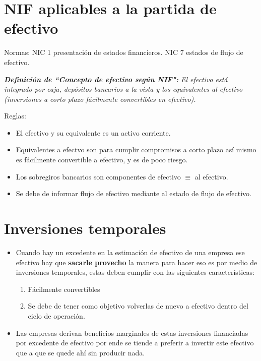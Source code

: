 \documentclass{article}
\begin{document}
\section{NIF aplicables a la partida de efectivo}
Normas: NIC 1  presentación de estados financieros.
NIC 7 estados de flujo de efectivo.


\emph{\textbf{Definición de ``Concepto de efectivo según NIF":} El efectivo está integrado por caja, depósitos bancarios a la vista y los equivalentes al efectivo (inversiones a corto plazo fácilmente convertibles en efectivo).} \newline 


Reglas:
\begin{itemize}
    \item El efectivo y su equivalente es un activo corriente.
    \item Equivalentes a efectvo son para cumplir compromisos a corto plazo así mismo es fácilmente convertible a efectivo, y es de poco riesgo.
    \item Los sobregiros bancarios son componentes de efectivo $\equiv$ al efectivo.
    \item Se debe de informar flujo de efectivo mediante al estado de flujo de efectivo.
\end{itemize}

\section{Inversiones temporales}
\begin{itemize}
    \item Cuando hay un excedente en la estimación de efectivo de una empresa ese efectivo hay que \textbf{sacarle provecho} la manera para hacer eso es por medio de inversiones temporales, estas deben cumplir con las siguientes características:
    \begin{enumerate}
        \item Fácilmente convertibles 
        \item Se debe de tener como objetivo volverlas de nuevo a efectivo dentro del ciclo de operación.
    \end{enumerate}
    
    \item Las empresas derivan beneficios marginales de estas inversiones financiadas por excedente de efectivo por ende se tiende a preferir a invertir este efectivo que a que se quede ahí sin producir nada.
\end{itemize}
\end{document}
